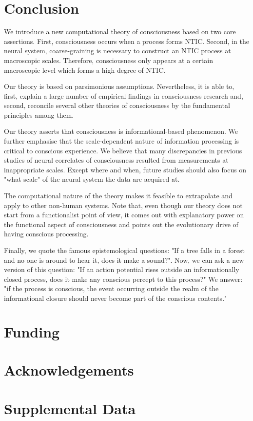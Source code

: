 \documentclass[utf8]{article}
\begin{document}
	\section{Conclusion}
	We introduce a new computational theory of consciousness based on two core assertions. First, consciousness occurs when a process forms NTIC. Second, in the neural system, coarse-graining is necessary to construct an NTIC process at macroscopic scales. Therefore, consciousness only appears at a certain macroscopic level which forms a high degree of NTIC. 
	
	Our theory is based on parsimonious assumptions. Nevertheless, it is able to, first, explain a large number of empirical findings in consciousness research and, second, reconcile several other theories of consciousness by the fundamental principles among them. 
	
	Our theory asserts that consciousness is informational-based phenomenon. We further emphasise that the scale-dependent nature of information processing is critical to conscious experience. We believe that many discrepancies in previous studies of neural correlates of consciousness resulted from measurements at inappropriate scales. Except where and when, future studies should also focus on "what scale" of the neural system the data are acquired at.
	
	The computational nature of the theory makes it feasible to extrapolate and apply to other non-human systems. Note that, even though our theory does not start from a functionalist point of view, it comes out with explanatory power on the functional aspect of consciousness and points out the evolutionary drive of having conscious processing. 
	
	Finally, we quote the famous epistemological questions: "If a tree falls in a forest and no one is around to hear it, does it make a sound?". Now, we can ask a new version of this question: "If an action potential rises outside an informationally closed process, does it make any conscious percept to this process?" We answer: "if the process is conscious, the event occurring outside the realm of the informational closure should never become part of the conscious contents."
    
    

	\section*{Funding}

	\section*{Acknowledgements}

	\section*{Supplemental Data}

	
	
\end{document}
